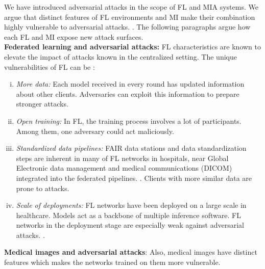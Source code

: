 We have introduced adversarial attacks in the scope of FL and MIA systems. We argue that distinct features of FL environments and MI make their combination highly vulnerable to adversarial attacks. \cite{chen2017targeted,chen2019deepinspect,ji2018model}.  The following paragraphs argue how each FL and MI expose new attack surfaces.
\\\textbf{Federated learning and adversarial attacks:} FL characteristics are known to elevate the impact of attacks known in the centralized setting. \cite{goldblum2020dataset,liu2022threats} The unique vulnerabilities of FL can be :
\begin{enumerate}[(i)]

\item{\textit{More data:} }
Each model received in every round has updated information about other clients. Adversaries can exploit this information to prepare stronger attacks.\cite{sun2019can,fang2020local,wang2020attack,song2020analyzing}
\item \textit{Open training:} In FL, the training process involves a lot of participants. Among them, one adversary could act maliciously.
\item{\textit{Standardized data pipelines:}} FAIR data stations and data standardization steps are inherent in many of FL networks in hospitals\cite{wilkinson2016fair}, near Global 
Electronic data management and medical communications (DICOM) integrated into the federated pipelines.
\cite{van2022ai}. Clients with more similar data are prone to attacks. \cite{miotto2016deep}
\item \textit{Scale of deployments:} FL networks have been deployed on a large scale in healthcare. Models act as a backbone of multiple inference software. FL networks in the deployment stage are especially weak against adversarial attacks. \cite{costa2021covert,bouacida2021vulnerabilities}.

\end{enumerate}
\textbf{Medical images and adversarial attacks}: Also, medical images have distinct features which makes the networks trained on them more vulnerable.
